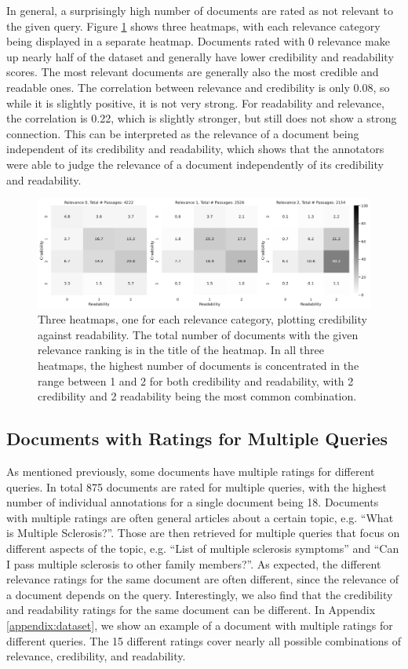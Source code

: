 In general, a surprisingly high number of documents are rated as not relevant to the given query.
Figure \ref{fig:heatmap_rel_cred_read} shows three heatmaps, with each relevance category being displayed in a separate heatmap.
Documents rated with 0 relevance make up nearly half of the dataset and generally have lower credibility and readability scores.
The most relevant documents are generally also the most credible and readable ones.
The correlation between relevance and credibility is only 0.08, so while it is slightly positive, it is not very strong.
For readability and relevance, the correlation is 0.22, which is slightly stronger, but still does not show a strong connection.
This can be interpreted as the relevance of a document being independent of its credibility and readability, which shows that the annotators were able to judge the relevance of a document independently of its credibility and readability.
\begin{figure}
\centering
\includegraphics[width=\textwidth]{images/heatmap_qrels.pdf}
\caption{Three heatmaps, one for each relevance category, plotting credibility against readability.
The total number of documents with the given relevance ranking is in the title of the heatmap.
In all three heatmaps, the highest number of documents is concentrated in the range between 1 and 2 for both credibility and readability, with 2 credibility and 2 readability being the most common combination.
}
\label{fig:heatmap_rel_cred_read}
\end{figure}

\subsection{Documents with Ratings for Multiple Queries}
As mentioned previously, some documents have multiple ratings for different queries.
In total 875 documents are rated for multiple queries, with the highest number of individual annotations for a single document being 18.
Documents with multiple ratings are often general articles about a certain topic, e.g. ``What is Multiple Sclerosis?''.
Those are then retrieved for multiple queries that focus on different aspects of the topic, e.g. ``List of multiple sclerosis symptoms'' and ``Can I pass multiple sclerosis to other family members?''.
As expected, the different relevance ratings for the same document are often different, since the relevance of a document depends on the query.
Interestingly, we also find that the credibility and readability ratings for the same document can be different.
In Appendix \ref{appendix:dataset}, we show an example of a document with multiple ratings for different queries.
The 15 different ratings cover nearly all possible combinations of relevance, credibility, and readability.

